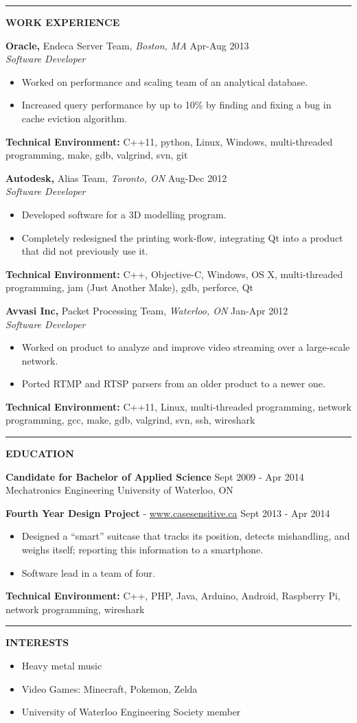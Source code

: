 \documentclass{letter}
\begin{document}
\vskip 2pt
\hrule
{\large\bf WORK EXPERIENCE}

{\bf Oracle,} Endeca Server Team, {\sl Boston, MA} \hfill Apr-Aug 2013 \\
{\sl Software Developer}
\begin{itemize}
  \item Worked on performance and scaling team of an analytical database.
  \item Increased query performance by up to 10\% by finding and fixing a bug in cache eviction algorithm.
\end{itemize}
{\bf Technical Environment:} C++11, python, Linux, Windows, multi-threaded programming, make, gdb, valgrind, svn, git

{\bf Autodesk,} Alias Team, {\sl Toronto, ON} \hfill Aug-Dec 2012 \\
{\sl Software Developer}
\begin{itemize}
  \item Developed software for a 3D modelling program.
  \item Completely redesigned the printing work-flow, integrating Qt into a product that did not previously use it.
\end{itemize}
{\bf Technical Environment:} C++, Objective-C, Windows, OS X, multi-threaded programming, jam (Just Another Make), gdb, perforce, Qt

{\bf Avvasi Inc,} Packet Processing Team, {\sl Waterloo, ON} \hfill Jan-Apr 2012 \\
{\sl Software Developer}
\begin{itemize}
  \item Worked on product to analyze and improve video streaming over a large-scale network.
  \item Ported RTMP and RTSP parsers from an older product to a newer one.
\end{itemize}
{\bf Technical Environment:} C++11, Linux, multi-threaded programming, network programming, gcc, make, gdb, valgrind, svn, ssh, wireshark

\vskip 2pt
\hrule

\newpage
{\large\bf EDUCATION}

{\bf Candidate for Bachelor of Applied Science} \hfill Sept 2009 - Apr 2014 \\
Mechatronics Engineering \hfill University of Waterloo, ON

{\bf Fourth Year Design Project} - \href{http://www.casesensitive.ca}{www.casesensitive.ca} \hfill Sept 2013 - Apr 2014
\begin{itemize}
  \item Designed a ``smart'' suitcase that tracks its position, detects mishandling, and weighs itself; reporting this information to a smartphone.
  \item Software lead in a team of four.
\end{itemize}
{\bf Technical Environment:} C++, PHP, Java, Arduino, Android, Raspberry Pi, network programming, wireshark

\vskip 2pt
\hrule
{\large\bf INTERESTS}
\begin{itemize}
  \item Heavy metal music
  \item Video Games: Minecraft, Pokemon, Zelda
  \item University of Waterloo Engineering Society member
\end{itemize}
\end{document}

